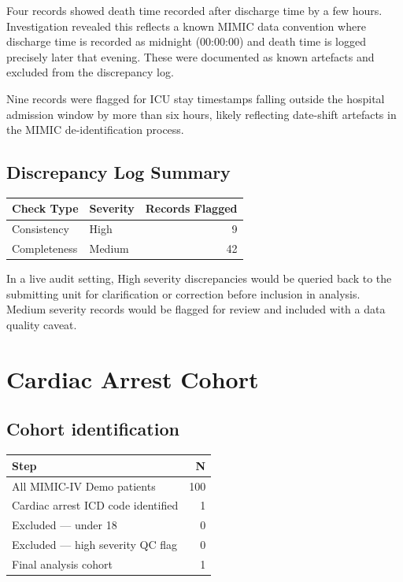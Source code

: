 \documentclass[
]{article}
\newcounter{none} %
\begin{document}
Four records showed death time recorded after discharge time by a few
hours. Investigation revealed this reflects a known MIMIC data
convention where discharge time is recorded as midnight (00:00:00) and
death time is logged precisely later that evening. These were documented
as known artefacts and excluded from the discrepancy log.

Nine records were flagged for ICU stay timestamps falling outside the
hospital admission window by more than six hours, likely reflecting
date-shift artefacts in the MIMIC de-identification process.

\subsection{Discrepancy Log Summary}\label{discrepancy-log-summary}

{\def\LTcaptype{none} %
\begin{longtable}[]{@{}llr@{}}
\toprule\noalign{}
Check Type & Severity & Records Flagged \\
\midrule\noalign{}
\endhead
\bottomrule\noalign{}
\endlastfoot
Consistency & High & 9 \\
Completeness & Medium & 42 \\
\end{longtable}
}

In a live audit setting, High severity discrepancies would be queried
back to the submitting unit for clarification or correction before
inclusion in analysis. Medium severity records would be flagged for
review and included with a data quality caveat.

\section{Cardiac Arrest Cohort}\label{cardiac-arrest-cohort}

\subsection{Cohort identification}\label{cohort-identification}

{\def\LTcaptype{none} %
\begin{longtable}[]{@{}lr@{}}
\toprule\noalign{}
Step & N \\
\midrule\noalign{}
\endhead
\bottomrule\noalign{}
\endlastfoot
All MIMIC-IV Demo patients & 100 \\
Cardiac arrest ICD code identified & 1 \\
Excluded --- under 18 & 0 \\
Excluded --- high severity QC flag & 0 \\
Final analysis cohort & 1 \\
\end{longtable}
}
\end{document}
